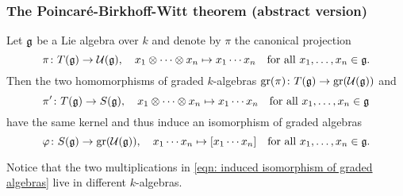 \subsubsection{The Poincar\'{e}-Birkhoff-Witt theorem (abstract version)}


\begin{thrm} \label{thrm: pbw abstract}
 Let $\mathfrak{g}$ be a Lie algebra over $k$ and denote by $\pi$ the canonical projection
 \[
  \pi \colon T(\mathfrak{g}) \to \mathcal{U}(\mathfrak{g}), \quad
  x_1 \otimes \dotsb \otimes x_n \mapsto x_1 \dotsm x_n
  \quad \text{for all $x_1, \dotsc, x_n \in \mathfrak{g}$}.
 \]
 Then the two homomorphisms of graded $k$-algebras $\operatorname{gr}(\pi) \colon T(\mathfrak{g}) \to \operatorname{gr}(\mathcal{U}(\mathfrak{g}))$ and
 \[
  \pi' \colon T(\mathfrak{g}) \to S(\mathfrak{g}), \quad 
  x_1 \otimes \dotsb \otimes x_n \mapsto x_1 \dotsm x_n
  \quad \text{for all $x_1, \dotsc, x_n \in \mathfrak{g}$}
 \]
 have the same kernel and thus induce an isomorphism of graded algebras
 \begin{equation}\label{eqn: induced isomorphism of graded algebras}
  \varphi \colon S(\mathfrak{g}) \to \operatorname{gr}(\mathcal{U}(\mathfrak{g})), \quad
  x_1 \dotsm x_n \mapsto [x_1 \dotsm x_n]
  \quad \text{for all $x_1, \dotsc, x_n \in \mathfrak{g}$}.
 \end{equation}
\end{thrm}


\begin{rem}
 Notice that the two multiplications in \eqref{eqn: induced isomorphism of graded algebras} live in different $k$-algebras.
\end{rem}


